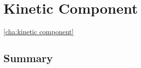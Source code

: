 \chapter{Kinetic Component}\ref{cha:kinetic component}


    
    
    


    \section*{Summary}
    